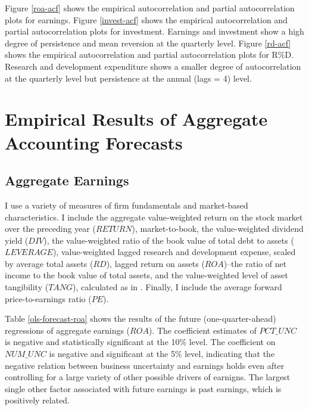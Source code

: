 \documentclass[12pt, letterpaper]{article}
\begin{document}
Figure \ref{roa-acf} shows the empirical autocorrelation and partial autocorrelation plots for earnings.
Figure \ref{invest-acf} shows the empirical autocorrelation and partial autocorrelation plots for investment. Earnings and investment show a high degree of persistence and mean reversion at the quarterly level.
Figure \ref{rd-acf} shows the empirical autocorrelation and partial autocorrelation plots for R\%D. Research and development expenditure shows a smaller degree of autocorrelation at the quarterly level but persistence at the annual (lags = 4) level.

\section{Empirical Results of Aggregate Accounting Forecasts}\label{results}

\subsection{Aggregate Earnings}
I use a variety of measures of firm fundamentals and market-based characteristics. I include the aggregate value-weighted return on the stock market over the preceding year ($RETURN$), market-to-book, the value-weighted dividend yield ($DIV$), the value-weighted ratio of the book value of total debt to assets ($LEVERAGE$), value-weighted lagged research and development expense, scaled by average total assets ($RD$), lagged return on assets ($ROA$)--the ratio of net income to the book value of total assets, and the value-weighted level of asset tangibility ($TANG$), calculated as in \cite{almeidacampello2007}. Finally, I include the average forward price-to-earnings ratio ($PE$).

Table \ref{ols-forecast-roa} shows the results of the future (one-quarter-ahead) regressions of aggregate earnings ($ROA$). The coefficient estimates of $PCT\_UNC$ is negative and statistically significant at the 10\% level. The coefficient on $NUM\_UNC$ is negative and significant at the 5\% level, indicating that the negative relation between business uncertainty and earnings holds even after controlling for a large variety of other possible drivers of earnigns. The largest single other factor associated with future earnings is past earnings, which is positively related.
\end{document}
